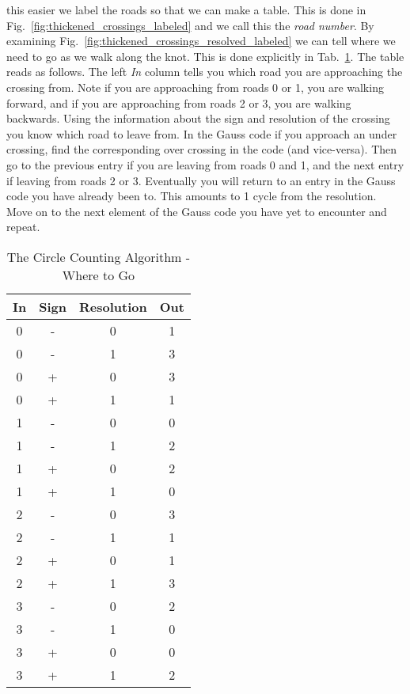         this easier we label the roads so that we can make a table. This is
        done in Fig.~\ref{fig:thickened_crossings_labeled} and we call this the
        \textit{road number}. By examining
        Fig.~\ref{fig:thickened_crossings_resolved_labeled} we can tell where
        we need to go as we walk along the knot. This is done explicitly in
        Tab.~\ref{tab:circle_counting_algorithm_where_go}.
        The table reads as follows.
        The left \textit{In} column tells you which road you are approaching the
        crossing from. Note if you are approaching from roads 0 or 1, you are
        walking forward, and if you are approaching from roads 2 or 3, you are
        walking backwards. Using the information about the sign and resolution
        of the crossing you know which road to leave from. In the Gauss code
        if you approach an under crossing, find the corresponding over crossing
        in the code (and vice-versa). Then go to the previous entry if you are
        leaving from roads 0 and 1, and the next entry if leaving from roads
        2 or 3. Eventually you will return to an entry in
        the Gauss code you have already been to. This amounts to 1 cycle from
        the resolution. Move on to the next element of the Gauss code you have
        yet to encounter and repeat.
        \begin{table}
            \centering
            \begin{tabular}{c c c c}
                In&Sign&Resolution&Out\\
                \hline
                0&-&0&1\\
                0&-&1&3\\
                0&+&0&3\\
                0&+&1&1\\
                \hline
                1&-&0&0\\
                1&-&1&2\\
                1&+&0&2\\
                1&+&1&0\\
                \hline
                2&-&0&3\\
                2&-&1&1\\
                2&+&0&1\\
                2&+&1&3\\
                \hline
                3&-&0&2\\
                3&-&1&0\\
                3&+&0&0\\
                3&+&1&2
            \end{tabular}
            \caption{The Circle Counting Algorithm - Where to Go}
            \label{tab:circle_counting_algorithm_where_go}
        \end{table}
